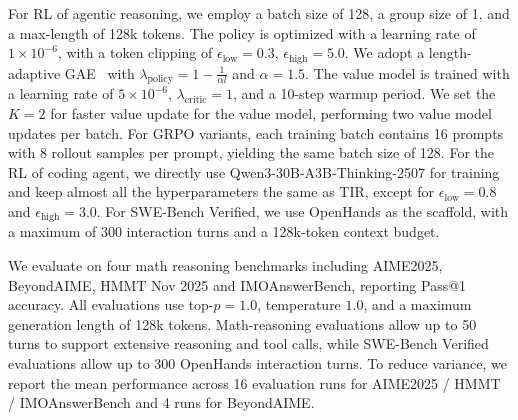 For RL of agentic reasoning, we employ a batch size of 128, a group size of 1, and a max-length of 128k tokens. The policy is optimized with a learning rate of $1 \times 10^{-6}$, with a token clipping of $\epsilon_{\text{low}}=0.3$, $\epsilon_{\text{high}}=5.0$. 
We adopt a length-adaptive GAE~\citep{yue2025vapo} with $\lambda_{\text{policy}} = 1 - \frac{1}{\alpha l}$ and $\alpha = 1.5$. The value model is trained with a learning rate of $5 \times 10^{-6}$, $\lambda_{\text{critic}} = 1$, and a 10-step warmup period. We set the $K=2$ for faster value update for the value model, performing two value model updates per batch. For GRPO variants, each training batch contains 16 prompts with 8 rollout samples per prompt, yielding the same batch size of 128.
For the RL of coding agent, we directly use Qwen3-30B-A3B-Thinking-2507 for training and keep almost all the hyperparameters the same as TIR, except for $\epsilon_{\text{low}}=0.8$ and $\epsilon_{\text{high}}=3.0$. For SWE-Bench Verified, we use OpenHands as the scaffold, with a maximum of 300 interaction turns and a 128k-token context budget.

 We evaluate \model on four math reasoning benchmarks including AIME2025, BeyondAIME\citep{bytedance_seed_2025_beyondaime}, 
HMMT Nov 2025\citep{balunovic2025matharena} and IMOAnswerBench\citep{luong-etal-2025-towards}, reporting Pass@1 accuracy. All evaluations use top-$p=1.0$, temperature $1.0$, and a maximum generation length of 128k tokens. Math-reasoning evaluations allow up to 50 turns to support extensive reasoning and tool calls, while SWE-Bench Verified evaluations allow up to 300 OpenHands interaction turns. To reduce variance, we report the mean performance across 16 evaluation runs for AIME2025 / HMMT / IMOAnswerBench and 4 runs for BeyondAIME.




